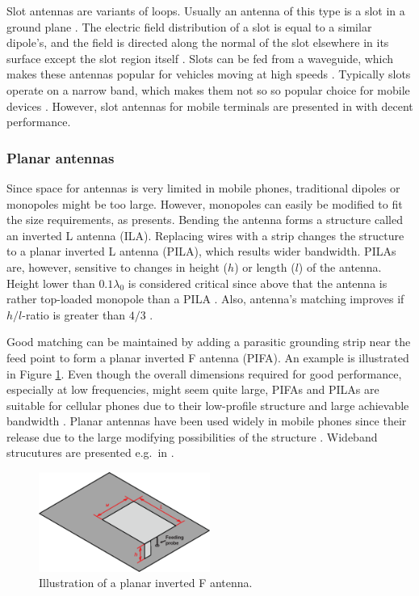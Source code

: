 Slot antennas are variants of loops. Usually an antenna of this type is a slot in a ground plane \cite{stutzman}. The electric field distribution of a slot is equal to a similar dipole's, and the field is directed along the normal of the slot elsewhere in its surface except the slot region itself \cite{volakis}. Slots can be fed from a waveguide, which makes these antennas popular for vehicles moving at high speeds \cite{mobile_antennas_handbook}. Typically slots operate on a narrow band, which makes them not so so popular choice for mobile devices \cite{stutzman}. However, slot antennas for mobile terminals are presented in \cite{slot_example1,slot_example2} with decent performance.

\subsubsection{Planar antennas}
\label{sec:planar}

Since space for antennas is very limited in mobile phones, traditional dipoles or monopoles might be too large. However, monopoles can easily be modified to fit the size requirements, as \cite{planar_antennas, balanis} presents. Bending the antenna forms a structure called an inverted L antenna (ILA). Replacing wires with a strip changes the structure to a planar inverted L antenna (PILA), which results wider bandwidth. PILAs are, however, sensitive to changes in height ($h$) or length ($l$) of the antenna. Height lower than $0.1\lambda_0$ is considered critical since above that the antenna is rather top-loaded monopole than a PILA \cite{planar_antennas}. Also, antenna's matching improves if $h/l$-ratio is greater than $4/3$ \cite{planar_antennas}. 

Good matching can be maintained by adding a parasitic grounding strip near the feed point to form a planar inverted F antenna (PIFA). An example is illustrated in Figure \ref{fig:pifa}. Even though the overall dimensions required for good performance, especially at low frequencies, might seem quite large, PIFAs and PILAs are suitable for cellular phones due to their low-profile structure and large achievable bandwidth \cite{balanis}. Planar antennas have been used widely in mobile phones since their release due to the large modifying possibilities of the structure \cite{planar_antennas}. Wideband strucutures are presented e.g.\ in \cite{pifa_example1,pifa_example2,pila_example1}.

\begin{figure}[H]
    \centering
    \includegraphics[width=0.5\textwidth]{img/pifa.eps}
    \caption{Illustration of a planar inverted F antenna.}
    \label{fig:pifa}
\end{figure}

